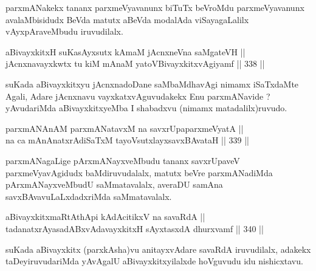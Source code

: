 \begin{artha}
parxmANakekx tananx parxmeVyavanunx biTuTx beVroMdu
parxmeVyavanunx avalaMbisidudx BeVda matutx aBeVda modalAda
viSayagaLalilx vAyxpAraveMbudu iruvudilalx.
\end{artha}

\begin{shl}
aBivayxkitxH suKasAyxsutx kAmaM jAcnxneVna saMgateVH || \\
\footnotemark[2]jAcnxnavayxkwtx tu kiM mAnaM yatoV\s BivayxkitxvAgiyamf ||  338 ||  
\end{shl}

\begin{artha}
suKada aBivayxkitxyu jAcnxnadoDane saMbaMdhavAgi nimamx
iSaTxdaMte Agali, Adare jAcnxnavu vayxkatxvAguvudakekx Enu
parxmANavide ? yAvudariMda aBivayxkitxyeMba I shabadxvu (nimamx
matadalilx)ruvudo. 
\end{artha}


\begin{shl}
parxmANAnAM parxmANatavxM na savxrUpaparxmeVyatA || \\
na ca mAnAnatxrAdiSaTxM tayoVsutxlayxsavxBAvataH ||  339 ||  
\end{shl}

\begin{artha}
parxmANagaLige pArxmANayxveMbudu tananx savxrUpaveV parxmeVyavAgidudx
baMdiruvudalalx, matutx beVre parxmANadiMda pArxmANayxveMbudU
saMmatavalalx, averaDU samAna savxBAvavuLaLxdadxriMda saMmatavalalx.
\end{artha}


\begin{shl}
aBivayxkitxmaRtA\s thApi kAdAcitikxV na savaRdA || \\
tadanatxrAyasadABxvAdavayxkitxH sAyxtasxdA dhurxvamf ||  340 ||  
\end{shl}

\begin{artha}
suKada aBivayxkitx (parxkAsha)vu anitayxvAdare savaRdA iruvudilalx,
adakekx taDeyiruvudariMda yAvAgalU aBivayxkitxyilalxde hoVguvudu idu nishicxtavu.
\end{artha}

